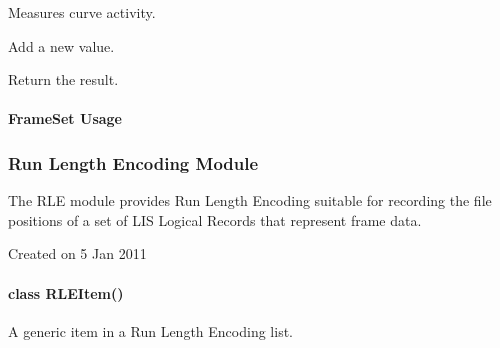 \documentclass[letterpaper,10pt,english]{sphinxmanual}
\begin{document}

\begin{fulllineitems}
\label{\detokenize{ref/LIS/core/FrameSet:TotalDepth.LIS.core.FrameSet.AccActivity}}
Measures curve activity.

\begin{fulllineitems}
\label{\detokenize{ref/LIS/core/FrameSet:TotalDepth.LIS.core.FrameSet.AccActivity.add}}
Add a new value.

\end{fulllineitems}


\begin{fulllineitems}
\label{\detokenize{ref/LIS/core/FrameSet:TotalDepth.LIS.core.FrameSet.AccActivity.value}}
Return the result.

\end{fulllineitems}


\end{fulllineitems}



\paragraph{FrameSet Usage}
\label{\detokenize{ref/LIS/core/FrameSet:frameset-usage}}

\subsubsection{Run Length Encoding Module}
\label{\detokenize{ref/LIS/core/Rle:run-length-encoding-module}}\label{\detokenize{ref/LIS/core/Rle::doc}}\label{\detokenize{ref/LIS/core/Rle:totaldepth-lis-core-rle}}\label{\detokenize{ref/LIS/core/Rle:module-TotalDepth.LIS.core.Rle}}
The RLE module provides Run Length Encoding suitable for recording the file
positions of a set of LIS Logical Records that represent frame data.

Created on 5 Jan 2011


\paragraph{class RLEItem()}
\label{\detokenize{ref/LIS/core/Rle:class-rleitem}}
A generic item in a Run Length Encoding list.
\end{document}
